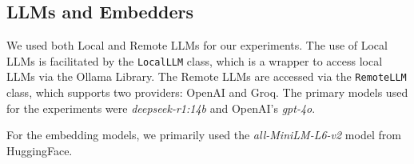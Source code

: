 \subsection{LLMs and Embedders}
We used both Local and Remote LLMs for our experiments. The use of Local LLMs is facilitated by the \texttt{LocalLLM} class, which is a wrapper 
to access local LLMs via the Ollama Library. The Remote LLMs are accessed via the \texttt{RemoteLLM} class, which supports two providers: OpenAI and Groq.
The primary models used for the experiments were \textit{deepseek-r1:14b} and OpenAI's \textit{gpt-4o}.  

For the embedding models, we primarily used the \textit{all-MiniLM-L6-v2} model from HuggingFace.
